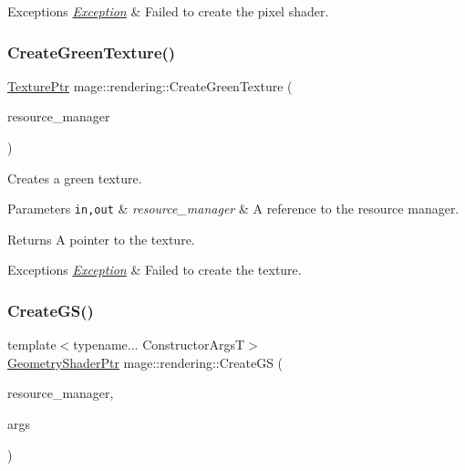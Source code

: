 \begin{DoxyExceptions}{Exceptions}
{\em \mbox{\hyperlink{classmage_1_1_exception}{Exception}}} & Failed to create the pixel shader. \\
\hline
\end{DoxyExceptions}
\mbox{\label{namespacemage_1_1rendering_acb78520fc876356259d3b58d403d4d27}} 
\subsubsection{\texorpdfstring{Create\+Green\+Texture()}{CreateGreenTexture()}}
{\footnotesize\ttfamily \mbox{\hyperlink{namespacemage_1_1rendering_a6f3ae54f825328465b0cdde0f0de4a36}{Texture\+Ptr}} mage\+::rendering\+::\+Create\+Green\+Texture (\begin{DoxyParamCaption}\item[{\mbox{\hyperlink{classmage_1_1rendering_1_1_resource_manager}{Resource\+Manager}} \&}]{resource\+\_\+manager }\end{DoxyParamCaption})}

Creates a green texture.


\begin{DoxyParams}[1]{Parameters}
\mbox{\tt in,out}  & {\em resource\+\_\+manager} & A reference to the resource manager. \\
\hline
\end{DoxyParams}
\begin{DoxyReturn}{Returns}
A pointer to the texture. 
\end{DoxyReturn}

\begin{DoxyExceptions}{Exceptions}
{\em \mbox{\hyperlink{classmage_1_1_exception}{Exception}}} & Failed to create the texture. \\
\hline
\end{DoxyExceptions}
\mbox{\label{namespacemage_1_1rendering_a36f39020d369b72c6db0497ff4f6fc72}} 
\subsubsection{\texorpdfstring{Create\+G\+S()}{CreateGS()}}
{\footnotesize\ttfamily template$<$typename... Constructor\+ArgsT$>$ \\
\mbox{\hyperlink{namespacemage_1_1rendering_aa5d63f80f9483d0896718813768ba1cf}{Geometry\+Shader\+Ptr}} mage\+::rendering\+::\+Create\+GS (\begin{DoxyParamCaption}\item[{\mbox{\hyperlink{classmage_1_1rendering_1_1_resource_manager}{Resource\+Manager}} \&}]{resource\+\_\+manager,  }\item[{Constructor\+ArgsT \&\&...}]{args }\end{DoxyParamCaption})}

